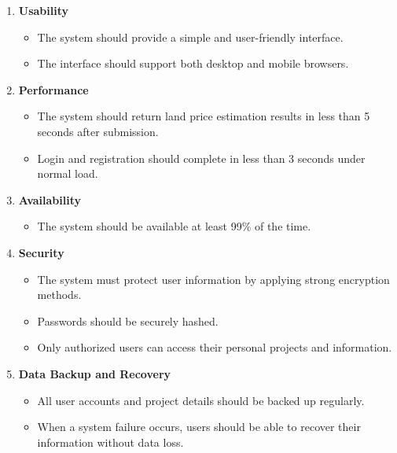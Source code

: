 \documentclass[12pt,oneside]{report}
\begin{document}
\begin{enumerate}[leftmargin=*,label=\arabic*.,align=left]

  \item \textbf{Usability}
  \begin{itemize}[leftmargin=1.2em]
    \item The system should provide a simple and user-friendly interface.
    \item The interface should support both desktop and mobile browsers.
  \end{itemize}

  \item \textbf{Performance}
  \begin{itemize}[leftmargin=1.2em]
    \item The system should return land price estimation results in less than 5 seconds after submission.
    \item Login and registration should complete in less than 3 seconds under normal load.
  \end{itemize}

  \item \textbf{Availability}
  \begin{itemize}[leftmargin=1.2em]
    \item The system should be available at least 99\% of the time.
  \end{itemize}

  \item \textbf{Security}
  \begin{itemize}[leftmargin=1.2em]
    \item The system must protect user information by applying strong encryption methods.
    \item Passwords should be securely hashed.
    \item Only authorized users can access their personal projects and information.
  \end{itemize}

  \item \textbf{Data Backup and Recovery}
  \begin{itemize}[leftmargin=1.2em]
    \item All user accounts and project details should be backed up regularly.
    \item When a system failure occurs, users should be able to recover their information without data loss.
  \end{itemize}

\end{enumerate}
\end{document}
